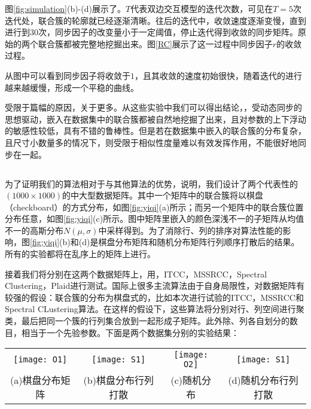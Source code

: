 \vspace{2mm}
图\ref{fig:simulation}(b)-(d)展示了。$T$代表双边交互模型的迭代次数，可见在$T=5$次迭代处，联合簇的轮廓就已经逐渐清晰。往后的迭代中，收敛速度逐渐变慢，直到进行到30次，同步因子的改变量小于一定阈值，停止迭代得到收敛的同步矩阵。原始的两个联合簇都被完整地挖掘出来。图\ref{RC}展示了这一过程中同步因子$r$的收敛过程。
\vspace{2mm}

从图中可以看到同步因子将收敛于$1$，且其收敛的速度初始很快，随着迭代的进行越来越缓慢，形成一个平稳的曲线。

受限于篇幅的原因，关于更多。从这些实验中我们可以得出结论，，受动态同步的思想驱动，嵌入在数据集中的联合簇都被自然地挖掘了出来，且对参数的上下浮动的敏感性较低，具有不错的鲁棒性。但是若在数据集中嵌入的联合簇的分布复杂，且尺寸小数量多的情况下，则受限于相似性度量难以有效发挥作用，不能很好地同步在一起。

\subsection{}
\label{subsec:compare}
为了证明我们的算法相对于与其他算法的优势，说明，我们设计了两个代表性的$(1000\times1000)$的中大型数据矩阵。其中一个矩阵中的联合簇将以棋盘（checkboard）的方式分布，如图\ref{fig:yiqi}(a)所示；而另一个矩阵中的联合簇位置分布任意，如图\ref{fig:yiqi}(c)所示。图中矩阵里嵌入的颜色深浅不一的子矩阵从均值不一的高斯分布$N(\mu,\sigma)$中采样得到。为了消除行、列的排序对算法性能的影响，图\ref{fig:yiqi}(b)和(d)是棋盘分布矩阵和随机分布矩阵行列顺序打散后的结果。所有的实验都将在乱序上的矩阵上进行。

接着我们将分别在这两个数据矩阵上，用\cosync，ITCC，MSSRCC，Spectral Clustering，Plaid进行测试。国际上很多主流算法由于自身局限性，对数据矩阵有较强的假设：联合簇的分布为棋盘式的，比如本次进行试验的ITCC，MSSRCC和\\Spectral CLustering算法。在这样的假设下，这些算法将分别对行、列空间进行聚类，最后把同一个簇的行列集合放到一起形成子矩阵。此外除、列各自划分的数目，相当于一个先验参数。下面是两个数据集分别的实验结果：

\vspace{4mm}
\tabcolsep=2pt
\begin{figure*}[!htb]
\centering
\begin{tabular}{cccc}
\texttt{[image: O1]}&
\texttt{[image: S1]}&
\texttt{[image: O2]}&
\texttt{[image: S1]}\\
(a)棋盘分布矩阵  & (b)棋盘分布行列打散 &(c)随机分布 &(d)随机分布行列打散
\end{tabular}
\caption{棋盘分布矩阵及行列顺序打散矩阵图}
\label{fig:yiqi}
\end{figure*}

